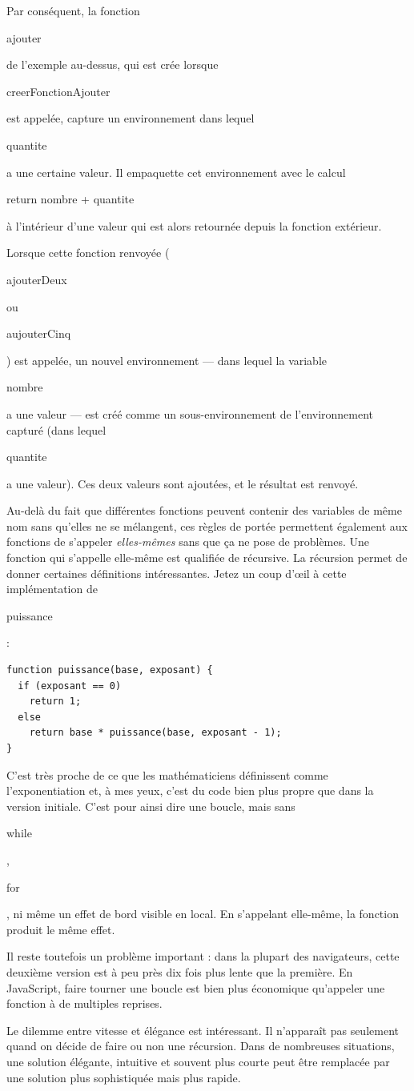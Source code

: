 \documentclass{FramateX}
\renewcommand{\texttt}[1]{\begin{sffamily}{#1}\end{sffamily}}
\begin{document}
Par conséquent, la fonction \texttt{ajouter} de l'exemple au-dessus, qui
est crée lorsque \texttt{creerFonctionAjouter} est appelée, capture un
environnement dans lequel \texttt{quantite} a une certaine valeur. Il
empaquette cet environnement avec le calcul
\texttt{return nombre + quantite} à l'intérieur d'une valeur qui est
alors retournée depuis la fonction extérieur.

Lorsque cette fonction renvoyée (\texttt{ajouterDeux} ou
\texttt{aujouterCinq}) est appelée, un nouvel environnement --- dans
lequel la variable \texttt{nombre} a une valeur --- est créé comme un
sous-environnement de l'environnement capturé (dans lequel
\texttt{quantite} a une valeur). Ces deux valeurs sont ajoutées, et le
résultat est renvoyé.

\begin{center}\end{center}

Au-delà du fait que différentes fonctions peuvent contenir des variables
de même nom sans qu'elles ne se mélangent, ces règles de portée
permettent également aux fonctions de s'appeler \emph{elles-mêmes} sans
que ça ne pose de problèmes. Une fonction qui s'appelle elle-même est
qualifiée de récursive. La récursion permet de donner certaines
définitions intéressantes. Jetez un coup d'œil à cette implémentation de
\texttt{puissance} :

\begin{lstlisting}
function puissance(base, exposant) {
  if (exposant == 0)
    return 1;
  else
    return base * puissance(base, exposant - 1);
}
\end{lstlisting}
C'est très proche de ce que les mathématiciens définissent comme
l'exponentiation et, à mes yeux, c'est du code bien plus propre que dans
la version initiale. C'est pour ainsi dire une boucle, mais sans
\texttt{while}, \texttt{for}, ni même un effet de bord visible en local.
En s'appelant elle-même, la fonction produit le même effet.

Il reste toutefois un problème important : dans la plupart des
navigateurs, cette deuxième version est à peu près dix fois plus lente
que la première. En JavaScript, faire tourner une boucle est bien plus
économique qu'appeler une fonction à de multiples reprises.

\begin{center}\end{center}

Le dilemme entre vitesse et élégance est intéressant. Il n'apparaît pas
seulement quand on décide de faire ou non une récursion. Dans de
nombreuses situations, une solution élégante, intuitive et souvent plus
courte peut être remplacée par une solution plus sophistiquée mais plus
rapide.
\end{document}
